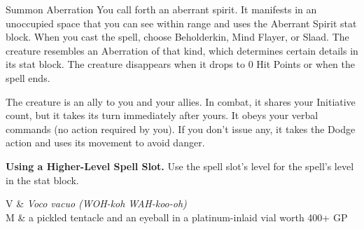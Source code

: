 \begin{Spell}[
  tags=Concentration,
  level={4th},
  time={1 action},
  range={90 ft},
  components={V, S, M},
  duration={Concentration 1 hour},
  school={Conjuration},
  attack={None},
  effect={Summoning}
]{Summon Aberration}
You call forth an aberrant spirit. It manifests in an unoccupied space that you can see within range and uses the Aberrant Spirit stat block. When you cast the spell, choose Beholderkin, Mind Flayer, or Slaad. The creature resembles an Aberration of that kind, which determines certain details in its stat block. The creature disappears when it drops to 0 Hit Points or when the spell ends.

The creature is an ally to you and your allies. In combat, it shares your Initiative count, but it takes its turn immediately after yours. It obeys your verbal commands (no action required by you). If you don't issue any, it takes the Dodge action and uses its movement to avoid danger.

\textbf{Using a Higher-Level Spell Slot.} Use the spell slot's level for the spell's level in the stat block.

\begin{components}
V & \textit{Voco vacuo (WOH-koh WAH-koo-oh)} \\
M & a pickled tentacle and an eyeball in a platinum-inlaid vial worth 400+ GP
\end{components}
\end{Spell}


